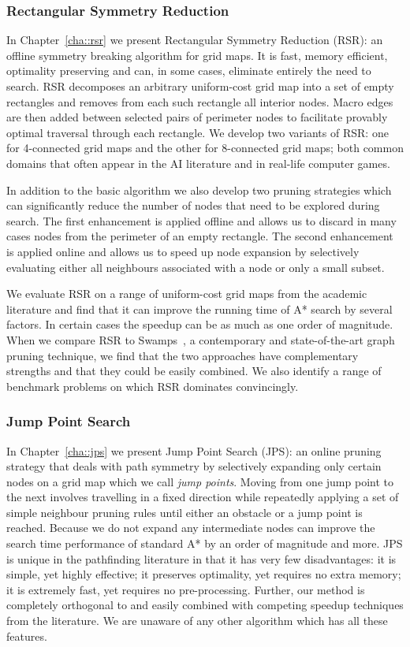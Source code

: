 \subsubsection{Rectangular Symmetry Reduction}
\label{cha::intro::contributions::rsr}
In Chapter~\ref{cha::rsr} we present Rectangular Symmetry Reduction (RSR): an
offline symmetry breaking algorithm for grid maps. It is fast, memory
efficient, optimality preserving and can, in some cases, eliminate entirely
the need to search.  RSR decomposes an arbitrary uniform-cost grid map into a
set of empty rectangles and removes from each such rectangle all interior
nodes.  Macro edges are then added between selected pairs of perimeter nodes
to facilitate provably optimal traversal through each rectangle.  We develop
two variants of RSR: one for 4-connected grid maps and the other for
8-connected grid maps; both common domains that often appear in the AI
literature and in real-life computer games.

In addition to the basic algorithm we also develop two pruning strategies
which can significantly reduce the number of nodes that need to be explored
during search.  The first enhancement is applied offline and allows us to
discard in many cases nodes from the perimeter of an empty rectangle. The
second enhancement is applied online and allows us to speed up node expansion
by selectively evaluating either all neighbours associated with a node or only
a small subset.

We evaluate RSR on a range of uniform-cost grid maps from the academic
literature and find that it can improve the running time of A{*} search by
several factors. In certain cases the speedup can be as much as one order of
magnitude. When we compare RSR to Swamps~\citep{pochter10}, a contemporary and
state-of-the-art graph pruning technique, we find that the two approaches have
complementary strengths and that they could be easily combined. We also
identify a range of benchmark problems on which RSR dominates convincingly.

\subsubsection{Jump Point Search}
\label{cha::intro::contributions::jps}
In Chapter~\ref{cha::jps} we present Jump Point Search (JPS): an online
pruning strategy that deals with path symmetry by selectively expanding only
certain nodes on a grid map which we call \emph{jump points}.  Moving from one
jump point to the next involves travelling in a fixed direction while
repeatedly applying a set of simple neighbour pruning rules until either an
obstacle or a jump point is reached.  Because we do not expand any
intermediate nodes can improve the search time performance of standard A{*} by
an order of magnitude and more.  JPS is unique in the pathfinding literature
in that it has very few disadvantages: it is simple, yet highly effective; it
preserves optimality, yet requires no extra memory;  it is extremely fast, yet
requires no pre-processing.  Further, our method is completely orthogonal to
and easily combined with competing speedup techniques from the literature.  We
are unaware of any other algorithm which has all these features.

